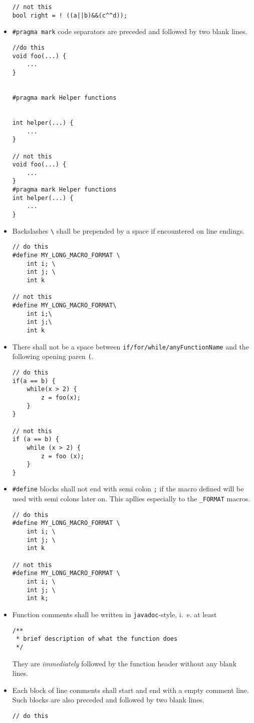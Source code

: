 \begin{itemize}
\begin{lstlisting}
// not this
bool right = ! ((a||b)&&(c^^d));
\end{lstlisting}
\item \lstinline|#pragma mark| code separators are preceded and followed by two blank lines.
\begin{lstlisting}
//do this
void foo(...) {
    ...
}


#pragma mark Helper functions


int helper(...) {
    ...
}

// not this
void foo(...) {
    ...
}
#pragma mark Helper functions
int helper(...) {
    ...
}
\end{lstlisting}
\item Backslashes \lstinline|\| shall be prepended by a space if
  encountered on line endings.
  \begin{lstlisting}
// do this
#define MY_LONG_MACRO_FORMAT \
    int i; \
    int j; \
    int k

// not this
#define MY_LONG_MACRO_FORMAT\
    int i;\
    int j;\
    int k
\end{lstlisting}
\item There shall not be a space between \lstinline|if/for/while/anyFunctionName|
  and the following opening paren \lstinline|(|.
  \begin{lstlisting}
// do this
if(a == b) {
    while(x > 2) {
        z = foo(x);
    }
}

// not this
if (a == b) {
    while (x > 2) {
        z = foo (x);
    }
}
\end{lstlisting}
\item \lstinline|#define| blocks shall not end with semi colon
  \lstinline|;| if the macro defined will be used with semi colons
  later on. This apllies especially to the \lstinline|_FORMAT|
  macros.
  \begin{lstlisting}
// do this
#define MY_LONG_MACRO_FORMAT \
    int i; \
    int j; \
    int k

// not this
#define MY_LONG_MACRO_FORMAT \
    int i; \
    int j; \
    int k;
\end{lstlisting}
\item Function comments shall be written in \verb|javadoc|-style,
  i.~e. at least
  \begin{lstlisting}
/**
 * brief description of what the function does
 */
\end{lstlisting}They are \emph{immediately} followed by the function header without any blank lines.
\item Each block of line comments shall start and end with a empty comment
  line. Such blocks are also preceded and followed by two blank lines.
\begin{lstlisting}
// do this



\end{lstlisting}
\end{itemize}
